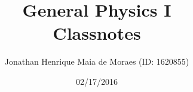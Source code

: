 \title{General Physics I \\ Classnotes}
\author{Jonathan Henrique Maia de Moraes (ID: 1620855)}
\date{02/17/2016}
\maketitle
